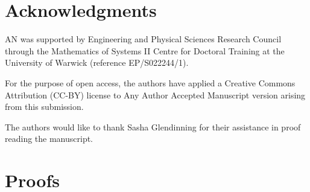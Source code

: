 \documentclass{article}
\begin{document}
\newpage



\section*{Acknowledgments}
AN was supported by Engineering and Physical Sciences Research Council through the Mathematics of Systems II Centre for Doctoral Training at the University of Warwick (reference EP/S022244/1). 

For the purpose of open access, the authors have applied a Creative Commons Attribution (CC-BY) license to Any Author Accepted Manuscript version arising from this submission.

The authors would like to thank Sasha Glendinning for their assistance in proof reading the manuscript. 

\newpage
\appendix

\section{Proofs} \label{Appendix: Proofs}
\end{document}
